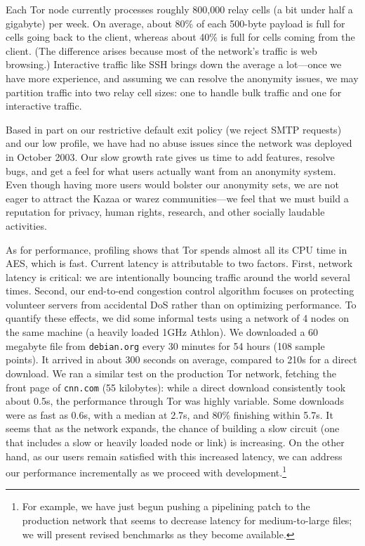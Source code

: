 \documentclass[times,10pt,twocolumn]{article}
\begin{document}
Each Tor node currently processes roughly 800,000 relay
cells (a bit under half a gigabyte) per week. On average, about 80\%
of each 500-byte payload is full for cells going back to the client,
whereas about 40\% is full for cells coming from the client. (The difference
arises because most of the network's traffic is web browsing.) Interactive
traffic like SSH brings down the average a lot---once we have more
experience, and assuming we can resolve the anonymity issues, we may
partition traffic into two relay cell sizes: one to handle
bulk traffic and one for interactive traffic.

Based in part on our restrictive default exit policy (we
reject SMTP requests) and our low profile, we have had no abuse
issues since the network was deployed in October
2003. Our slow growth rate gives us time to add features,
resolve bugs, and get a feel for what users actually want from an
anonymity system.  Even though having more users would bolster our
anonymity sets, we are not eager to attract the Kazaa or warez
communities---we feel that we must build a reputation for privacy, human
rights, research, and other socially laudable activities.

As for performance, profiling shows that Tor spends almost
all its CPU time in AES, which is fast.  Current latency is attributable
to two factors. First, network latency is critical: we are
intentionally bouncing traffic around the world several times. Second,
our end-to-end congestion control algorithm focuses on protecting
volunteer servers from accidental DoS rather than on optimizing
performance. %
To quantify these effects, we did some informal tests using a network of 4
nodes on the same machine (a heavily loaded 1GHz Athlon). We downloaded a 60
megabyte file from {\tt debian.org} every 30 minutes for 54 hours (108 sample
points). It arrived in about 300 seconds on average, compared to 210s for a
direct download. We ran a similar test on the production Tor network,
fetching the front page of {\tt cnn.com} (55 kilobytes): while a direct
download consistently took about 0.5s, the performance through Tor was highly
variable. Some downloads were as fast as 0.6s, with a median at 2.7s, and
80\% finishing within 5.7s.  It seems that as the network expands, the chance
of building a slow circuit (one that includes a slow or heavily loaded node
or link) is increasing.  On the other hand, as our users remain satisfied
with this increased latency, we can address our performance incrementally as we
proceed with development.\footnote{For example, we have just begun pushing
  a pipelining patch to the production network that seems to
  decrease latency for medium-to-large files; we will present revised
  benchmarks as they become available.}
\end{document}
